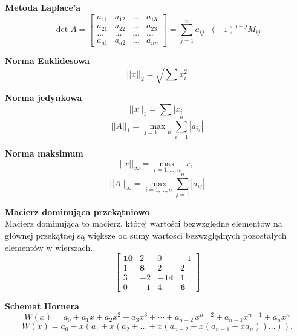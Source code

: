 \documentclass[../mn-notatki.tex]{subfiles}
\begin{document}
\begin{tcolorbox}
\textbf{Metoda Laplace'a}
\[
\det A =
\begin{bmatrix}
a_{11} & a_{12} & \ldots &a_{13}\\
a_{21} & a_{22} & \ldots &a_{23}\\
\ldots & \ldots & \ldots &\ldots\\
a_{a1} & a_{a2} & \ldots &a_{nn}
\end{bmatrix}
=
\sum_{j=1}^{n} a_{ij} \cdot (-1)^{i+j} M_{ij}
\]
\end{tcolorbox}

\begin{tcolorbox}
\textbf{Norma Euklidesowa}
\[
||x||_2 = \sqrt{\sum x_i^2}
\]
\end{tcolorbox}

\begin{tcolorbox}
\textbf{Norma jedynkowa}
\[
||x||_1 = \sum |x_i|
\]
\[
||A||_1 = \max_{j = 1, \ldots, n} \sum_{i = 1}^{n} |a_{ij}|
\]
\end{tcolorbox}

\begin{tcolorbox}
\textbf{Norma maksimum}
\[
||x||_\infty = \max_{i = 1, \ldots, n} |x_i|
\]
\[
||A||_\infty = \max_{i = 1, \ldots, n} \sum_{j = 1}^{n} |a_{ij}|
\]
\end{tcolorbox}

\begin{tcolorbox}
\textbf{Macierz dominująca przekątniowo}\\
Macierz dominująca to macierz, której wartości bezwzględne elementów na głównej
przekątnej są większe od sumy wartości bezwzględnych pozostałych elementów w
wierszach.
\[
{\displaystyle {\begin{bmatrix}\mathbf {10} &2&0&-1\\1&\mathbf {8} &2&2\\3&-2&\mathbf {-14} &1\\0&-1&4&\mathbf {6} \end{bmatrix}}}
\]
\end{tcolorbox}

\begin{tcolorbox}
\textbf{Schemat Hornera}\\
\[
{\displaystyle W(x)=a_{0}+a_{1}x+a_{2}x^{2}+a_{3}x^{3}+\cdots +a_{n-2}\,x^{n-2}+a_{n-1}x^{n-1}+a_{n}x^{n}}
\]
\[
{\displaystyle W(x)=a_{0}+x(a_{1}+x(a_{2}+\ldots +x(a_{n-2}+x(a_{n-1}+xa_{n}))\ldots )).}
\]
\end{tcolorbox}

\pagebreak
\end{document}
